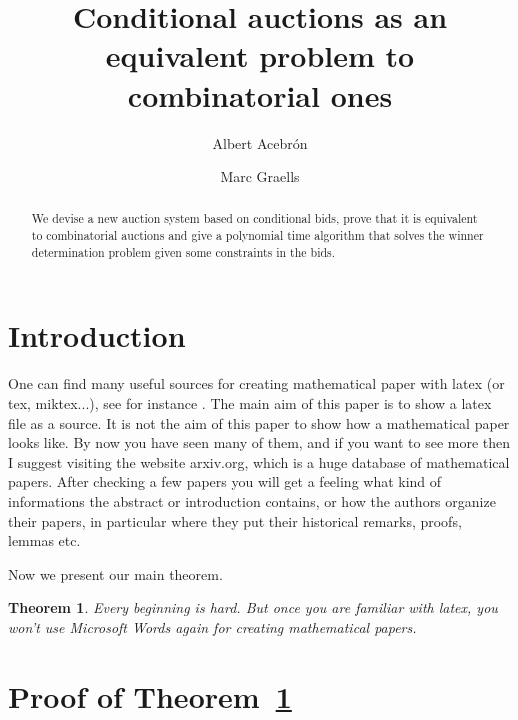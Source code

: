 \documentclass[12pt,a4paper]{amsart}
\numberwithin{equation}{section}
\theoremstyle{plain}
\newtheorem{Th}{Theorem}[section]
\theoremstyle{definition}
\begin{document}
\title{Conditional auctions as an equivalent problem to combinatorial ones}


\author[A. Acebrón]{Albert Acebrón}
\author[M. Graells]{Marc Graells}

\address{Universitat Autònoma de Barcelona, Barcelona, Spain} 



\subjclass[2019]{}





\begin{abstract} We devise a new auction system based on conditional bids, prove that it is equivalent to combinatorial auctions and give a polynomial time algorithm that solves the winner determination problem given some constraints in the bids.
\end{abstract}

\maketitle

\section{Introduction} One can find many useful sources for creating mathematical paper with latex (or tex, miktex...), see for instance \cite{wilk,wiki}. The main aim of this paper is to show a latex file as a source. It is not the aim of this paper to show how a mathematical paper looks like. By now you have seen many of them, and if you want to see more then I suggest visiting the website arxiv.org, which is a huge database of mathematical papers. After checking a few papers you will get a feeling what kind of informations the abstract or introduction contains, or how the authors organize their papers, in particular where they put their historical remarks, proofs, lemmas etc. 

Now we present our main theorem.

\begin{Th} \label{main} Every beginning is hard. But once you are familiar with latex, you won't use Microsoft Words again for creating mathematical papers.
\end{Th}

\section{Proof of Theorem~\ref{main}}
\end{document}
